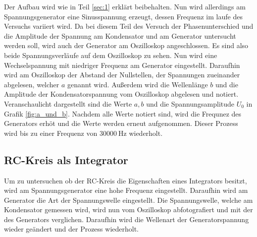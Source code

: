 Der Aufbau wird wie in Teil \ref{sec:1} erklärt beibehalten.
Nun wird allerdings am Spannungsgenerator eine Sinusspannung erzeugt, dessen Frequenz im laufe des Versuchs variiert wird.
Da bei diesem Teil des Versuch der Phasenunterschied und die Amplitude der Spannung am Kondensator und am Generator untersucht werden soll, wird auch der Generator am Oszilloskop angeschlossen.
Es sind also beide Spannungsverläufe auf dem Oszilloskop zu sehen.
Nun wird eine Wechselspannung mit niedriger Frequenz am Generator eingestellt.
Daraufhin wird am Oszilloskop der Abstand der Nullstellen, der Spannungen zueinander abgelesen, welcher $a$ genannt wird.
Außerdem wird die Wellenlänge $b$ und die Amplitude der Kondensatorspannung vom Oszilloskop abgelesen und notiert.
Veranschaulicht dargestellt sind die Werte $a, b$ und die Spannungsamplitude $U_0$ in Grafik \ref{fig:a_und_b}.
Nachdem alle Werte notiert sind, wird die Frequnez des Generators erhöt und die Werte werden erneut aufgenommen.
Dieser Prozess wird bis zu einer Frequenz von $\SI{30000}{\hertz}$ wiederholt.


\subsection{RC-Kreis als Integrator}
Um zu untersuchen ob der RC-Kreis die Eigenschaften eines Integrators besitzt, wird am Spannungsgenerator eine hohe Frequenz eingestellt.
Daraufhin wird am Generator die Art der Spannungswelle eingestellt.
Die Spannungswelle, welche am Kondensator gemessen wird, wird nun vom Oszilloskop abfotografiert und mit der des Generators verglichen.
Daraufhin wird die Wellenart der Generatorspannung wieder geändert und der Prozess wiederholt.
